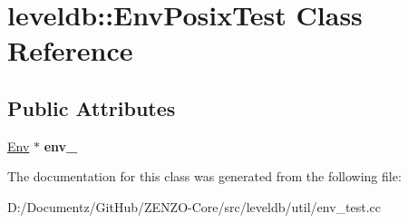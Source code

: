 \hypertarget{classleveldb_1_1_env_posix_test}{}\section{leveldb\+::Env\+Posix\+Test Class Reference}
\label{classleveldb_1_1_env_posix_test}
\subsection*{Public Attributes}
\begin{DoxyCompactItemize}
\item 
\mbox{\label{classleveldb_1_1_env_posix_test_a6d8ded8756fa7391e086fb31a865e639}} 
\mbox{\hyperlink{classleveldb_1_1_env}{Env}} $\ast$ {\bfseries env\+\_\+}
\end{DoxyCompactItemize}


The documentation for this class was generated from the following file\+:\begin{DoxyCompactItemize}
\item 
D\+:/\+Documentz/\+Git\+Hub/\+Z\+E\+N\+Z\+O-\/\+Core/src/leveldb/util/env\+\_\+test.\+cc\end{DoxyCompactItemize}
